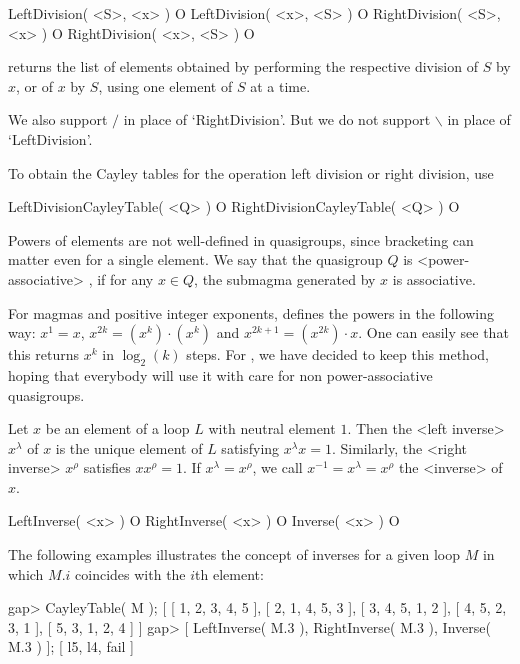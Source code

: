 \>LeftDivision( <S>, <x> ) O
\>LeftDivision( <x>, <S> ) O
\>RightDivision( <S>, <x> ) O
\>RightDivision( <x>, <S> ) O

returns the list of elements obtained by performing the respective
division of $S$ by $x$, or of $x$ by $S$, using one element of $S$ at a time.

We also support $/$ in place of `RightDivision'. But we do not support
$\backslash$ in place of `LeftDivision'.

To obtain the Cayley tables for the operation left division or
right division, use

\>LeftDivisionCayleyTable( <Q> ) O
\>RightDivisionCayleyTable( <Q> ) O


Powers of elements are not well-defined in quasigroups, since bracketing can
matter even for a single element. We say that the quasigroup $Q$ is
<power-associative>
%
%
, if for any $x\in Q$, the submagma generated by $x$ is
associative.

For magmas and positive integer exponents, {\GAP} defines the powers in the
following way: $x^1=x$, $x^{2k}=(x^k)\cdot(x^k)$ and $x^{2k+1}=(x^{2k})\cdot
x$. One can easily see that this returns $x^k$ in $\log_2(k)$ steps. For
{\LOOPS}, we have decided to keep this method, hoping that everybody will use
it with care for non power-associative quasigroups.

Let $x$ be an element of a loop $L$ with neutral element $1$. Then the
<left inverse>
%
%
 $x^\lambda$ of $x$ is the unique element of $L$ satisfying
$x^\lambda x=1$. Similarly, the <right inverse>
%
%
 $x^\rho$ satisfies
$xx^\rho=1$. If $x^\lambda=x^\rho$, we call $x^{-1}=x^\lambda=x^\rho$ the
<inverse>
%
%
 of $x$.

\>LeftInverse( <x> ) O
\>RightInverse( <x> ) O
\>Inverse( <x> ) O

The following examples illustrates the concept of inverses for a given loop $M$
in which $M.i$ coincides with the $i$th element:

\beginexample
gap> CayleyTable( M );
[ [ 1, 2, 3, 4, 5 ],
  [ 2, 1, 4, 5, 3 ],
  [ 3, 4, 5, 1, 2 ],
  [ 4, 5, 2, 3, 1 ],
  [ 5, 3, 1, 2, 4 ] ]
gap> [ LeftInverse( M.3 ), RightInverse( M.3 ), Inverse( M.3 ) ];
[ l5, l4, fail ]
\endexample


